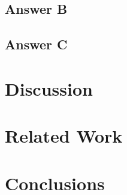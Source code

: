 \subsection{Answer B}

\subsection{Answer C}





\section{Discussion}\label{sec:discussion3}


\section{Related Work}\label{sec:rw}


\section{Conclusions}\label{sec:conc}

